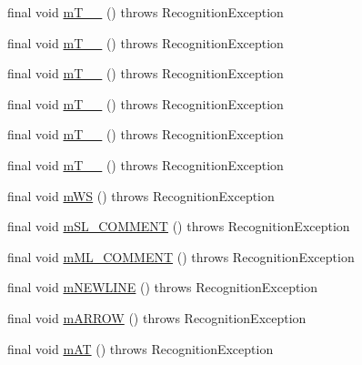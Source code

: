 \begin{DoxyCompactItemize}
\item 
final void \hyperlink{classorg_1_1tzi_1_1use_1_1parser_1_1ocl_1_1_o_c_l_lexer_ab590d1e3cd5a34cbe1790e70e582b019}{m\-T\-\_\-\-\_} ()  throws Recognition\-Exception 
\item 
final void \hyperlink{classorg_1_1tzi_1_1use_1_1parser_1_1ocl_1_1_o_c_l_lexer_a67f0ea3a48326b93854c2d1b9dbd70bb}{m\-T\-\_\-\-\_} ()  throws Recognition\-Exception 
\item 
final void \hyperlink{classorg_1_1tzi_1_1use_1_1parser_1_1ocl_1_1_o_c_l_lexer_a6fb67bdf25f25a59c84369e78cd2c6bc}{m\-T\-\_\-\-\_} ()  throws Recognition\-Exception 
\item 
final void \hyperlink{classorg_1_1tzi_1_1use_1_1parser_1_1ocl_1_1_o_c_l_lexer_a3f81039399df1788f60c5e9f473a33ae}{m\-T\-\_\-\-\_} ()  throws Recognition\-Exception 
\item 
final void \hyperlink{classorg_1_1tzi_1_1use_1_1parser_1_1ocl_1_1_o_c_l_lexer_a720413b1cd355e8a0e0bfcef9d19d8c3}{m\-T\-\_\-\-\_} ()  throws Recognition\-Exception 
\item 
final void \hyperlink{classorg_1_1tzi_1_1use_1_1parser_1_1ocl_1_1_o_c_l_lexer_a07c15a9655b9dc5e47596d63772cbed6}{m\-T\-\_\-\-\_} ()  throws Recognition\-Exception 
\item 
final void \hyperlink{classorg_1_1tzi_1_1use_1_1parser_1_1ocl_1_1_o_c_l_lexer_a30616321dccb8170a67d11e55ea2a73c}{m\-W\-S} ()  throws Recognition\-Exception 
\item 
final void \hyperlink{classorg_1_1tzi_1_1use_1_1parser_1_1ocl_1_1_o_c_l_lexer_a4bfd597c5e166a7175e143104ff0bc52}{m\-S\-L\-\_\-\-C\-O\-M\-M\-E\-N\-T} ()  throws Recognition\-Exception 
\item 
final void \hyperlink{classorg_1_1tzi_1_1use_1_1parser_1_1ocl_1_1_o_c_l_lexer_a63052d78b5832222604014705767e41e}{m\-M\-L\-\_\-\-C\-O\-M\-M\-E\-N\-T} ()  throws Recognition\-Exception 
\item 
final void \hyperlink{classorg_1_1tzi_1_1use_1_1parser_1_1ocl_1_1_o_c_l_lexer_ad3892e6883890013fb1c83605b016cf7}{m\-N\-E\-W\-L\-I\-N\-E} ()  throws Recognition\-Exception 
\item 
final void \hyperlink{classorg_1_1tzi_1_1use_1_1parser_1_1ocl_1_1_o_c_l_lexer_a54ca64ea6b939b7869cf01f050a700c5}{m\-A\-R\-R\-O\-W} ()  throws Recognition\-Exception 
\item 
final void \hyperlink{classorg_1_1tzi_1_1use_1_1parser_1_1ocl_1_1_o_c_l_lexer_a75a736d47faf085c3d2c280cd77ea9fc}{m\-A\-T} ()  throws Recognition\-Exception 
\item 

\end{DoxyCompactItemize}
